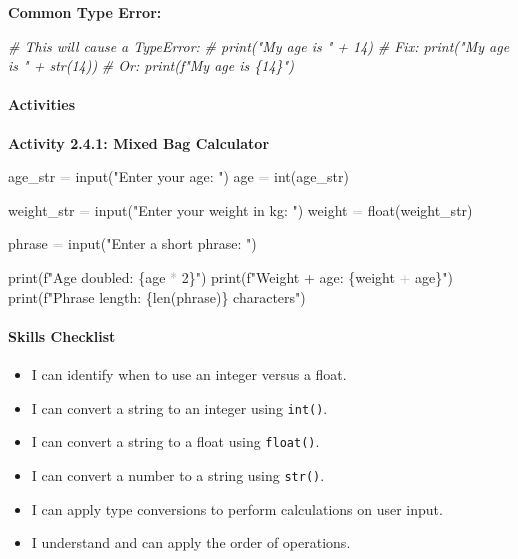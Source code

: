 \documentclass[
  justified,
  openright,
]{tufte-book}
\let\subsection\paragraph
\let\paragraph\paragraph
\newcommand{\StringTok}[1]{\textcolor{CodeString}{#1}}              %
\newcommand{\CommentTok}[1]{\textcolor{CodeComment}{\textit{#1}}}  %
\newcommand{\CodeNumTok}[1]{\textcolor{CodeNumber}{#1}}             %
\newcommand{\OperatorTok}[1]{\textcolor{DarkGray}{#1}}              %
\newenvironment{Shaded}{%
  \begin{mdframed}[style=TufteCode]%
}{%
  \end{mdframed}%
}
\let\subsection\paragraph
\let\paragraph\paragraph
\providecommand{\tightlist}{%
  \setlength{\itemsep}{0pt}\setlength{\parskip}{0pt}}
\begin{document}
\textbf{Common Type Error:}

\begin{Shaded}
\begin{Highlighting}[]
\CommentTok{\# This will cause a TypeError:}
\CommentTok{\# print("My age is " + 14)}
\CommentTok{\# Fix: print("My age is " + str(14))}
\CommentTok{\# Or: print(f"My age is \{14\}")}
\end{Highlighting}
\end{Shaded}

\subsection{Activities}\label{activities-5}

\textbf{Activity 2.4.1: Mixed Bag Calculator}

\begin{Shaded}
\begin{Highlighting}[]
age\_str \OperatorTok{=} input(\StringTok{"Enter your age: "})
age \OperatorTok{=} int(age\_str)
 
weight\_str \OperatorTok{=} input(\StringTok{"Enter your weight in kg: "})
weight \OperatorTok{=} float(weight\_str)
 
phrase \OperatorTok{=} input(\StringTok{"Enter a short phrase: "})
 
print(\StringTok{f"Age doubled: }\StringTok{\{}age \OperatorTok{*} \CodeNumTok{2}\StringTok{\}}\StringTok{"})
print(\StringTok{f"Weight + age: }\StringTok{\{}weight \OperatorTok{+} age\StringTok{\}}\StringTok{"})
print(\StringTok{f"Phrase length: }\StringTok{\{}len(phrase)\StringTok{\}}\StringTok{ characters"})
\end{Highlighting}
\end{Shaded}

\subsection{Skills Checklist}\label{skills-checklist-10}

\begin{itemize}
\tightlist
\item[$\square$]
  I can identify when to use an integer versus a float.
\item[$\square$]
  I can convert a string to an integer using \texttt{int()}.
\item[$\square$]
  I can convert a string to a float using \texttt{float()}.
\item[$\square$]
  I can convert a number to a string using \texttt{str()}.
\item[$\square$]
  I can apply type conversions to perform calculations on user input.
\item[$\square$]
  I understand and can apply the order of operations.
\end{itemize}
\end{document}
